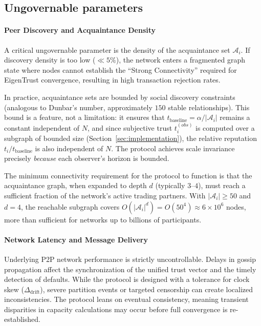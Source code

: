 \documentclass[11pt]{article}
\begin{document}
\subsection{Ungovernable parameters}

\paragraph{Peer Discovery and Acquaintance Density}
A critical ungovernable parameter is the density of the acquaintance set $\mathcal{A}_i$. If discovery density is too low ($\ll 5\%$), the network enters a fragmented graph state where nodes cannot establish the ``Strong Connectivity'' required for EigenTrust convergence, resulting in high transaction rejection rates.

In practice, acquaintance sets are bounded by social discovery constraints (analogous to Dunbar's number, approximately $150$ stable relationships). This bound is a feature, not a limitation: it ensures that $t_{\text{baseline}} = \alpha / |\mathcal{A}_i|$ remains a constant independent of $N$, and since subjective trust $t_i^{(obs)}$ is computed over a subgraph of bounded size (Section~\ref{sec:implementation}), the relative reputation $t_i / t_{\text{baseline}}$ is also independent of $N$. The protocol achieves scale invariance precisely \emph{because} each observer's horizon is bounded.

The minimum connectivity requirement for the protocol to function is that the acquaintance graph, when expanded to depth $d$ (typically $3$--$4$), must reach a sufficient fraction of the network's active trading partners. With $|\mathcal{A}_i| \geq 50$ and $d = 4$, the reachable subgraph covers $O(|\mathcal{A}_i|^d) = O(50^4) \approx 6 \times 10^6$ nodes, more than sufficient for networks up to billions of participants.

\paragraph{Network Latency and Message Delivery}
Underlying P2P network performance is strictly uncontrollable. Delays in gossip propagation affect the synchronization of the unified trust vector and the timely detection of defaults. While the protocol is designed with a tolerance for clock skew ($\Delta_{\text{drift}}$), severe partition events or targeted censorship can create localized inconsistencies. The protocol leans on eventual consistency, meaning transient disparities in capacity calculations may occur before full convergence is re-established.
\end{document}
